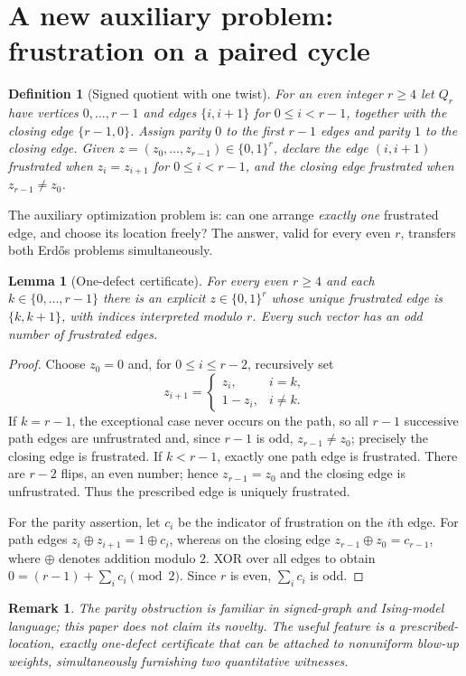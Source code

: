\documentclass[11pt,a4paper]{article}
\newtheorem{lemma}[theorem]{Lemma}
\newtheorem{definition}[theorem]{Definition}
\newtheorem{remark}[theorem]{Remark}
\begin{document}
\section{A new auxiliary problem: frustration on a paired cycle}
\begin{definition}[Signed quotient with one twist]\label{def:signed}
For an even integer $r\ge4$ let $Q_r$ have vertices $0,\ldots,r-1$ and edges
$\{i,i+1\}$ for $0\le i<r-1$, together with the closing edge $\{r-1,0\}$. Assign parity $0$ to the first $r-1$ edges and parity $1$ to the closing edge. Given $z=(z_0,\ldots,z_{r-1})\in\{0,1\}^r$, declare the edge $(i,i+1)$ \emph{frustrated} when $z_i=z_{i+1}$ for $0\le i<r-1$, and the closing edge frustrated when $z_{r-1}\ne z_0$.
\end{definition}
The auxiliary optimization problem is: can one arrange \emph{exactly one} frustrated edge, and choose its location freely? The answer, valid for every even $r$, transfers both Erd\H{o}s problems simultaneously.
\begin{lemma}[One-defect certificate]\label{lem:one}
For every even $r\ge4$ and each $k\in\{0,\ldots,r-1\}$ there is an explicit $z\in\{0,1\}^r$ whose unique frustrated edge is $\{k,k+1\}$, with indices interpreted modulo $r$. Every such vector has an odd number of frustrated edges.
\end{lemma}
\begin{proof}
Choose $z_0=0$ and, for $0\le i\le r-2$, recursively set
\[
 z_{i+1}=\begin{cases}
 z_i,&i=k,\\
 1-z_i,&i\ne k.
 \end{cases}
\]
If $k=r-1$, the exceptional case never occurs on the path, so all $r-1$ successive path edges are unfrustrated and, since $r-1$ is odd, $z_{r-1}\ne z_0$; precisely the closing edge is frustrated. If $k<r-1$, exactly one path edge is frustrated. There are $r-2$ flips, an even number; hence $z_{r-1}=z_0$ and the closing edge is unfrustrated. Thus the prescribed edge is uniquely frustrated.

For the parity assertion, let $c_i$ be the indicator of frustration on the $i$th edge. For path edges $z_i\oplus z_{i+1}=1\oplus c_i$, whereas on the closing edge $z_{r-1}\oplus z_0=c_{r-1}$, where $\oplus$ denotes addition modulo $2$. XOR over all edges to obtain
$0=(r-1)+\sum_i c_i\pmod2$. Since $r$ is even, $\sum_i c_i$ is odd.
\end{proof}
\begin{remark}
The parity obstruction is familiar in signed-graph and Ising-model language; this paper does not claim its novelty. The useful feature is a \emph{prescribed-location, exactly one-defect} certificate that can be attached to nonuniform blow-up weights, simultaneously furnishing two quantitative witnesses.
\end{remark}
\end{document}
